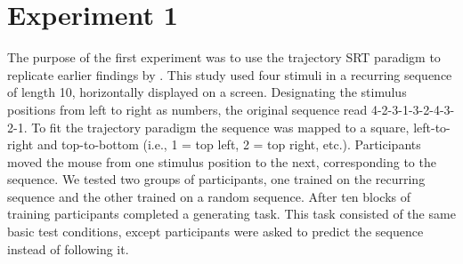 \documentclass[man,floatsintext]{apa6}
\begin{document}



\section{Experiment 1}

The purpose of the first experiment was to use the trajectory SRT paradigm to replicate earlier findings by . This study used four stimuli in a recurring sequence of length 10, horizontally displayed on a screen. Designating the stimulus positions from left to right as numbers, the original sequence read 4-2-3-1-3-2-4-3-2-1. To fit the trajectory paradigm the sequence was mapped to a square, left-to-right and top-to-bottom (i.e., 1 = top left, 2 = top right, etc.). Participants moved the mouse from one stimulus position to the next, corresponding to the sequence. We tested two groups of participants, one trained on the recurring sequence and the other trained on a random sequence. After ten blocks of training participants completed a generating task. This task consisted of the same basic test conditions, except participants were asked to predict the sequence instead of following it. 
\end{document}
